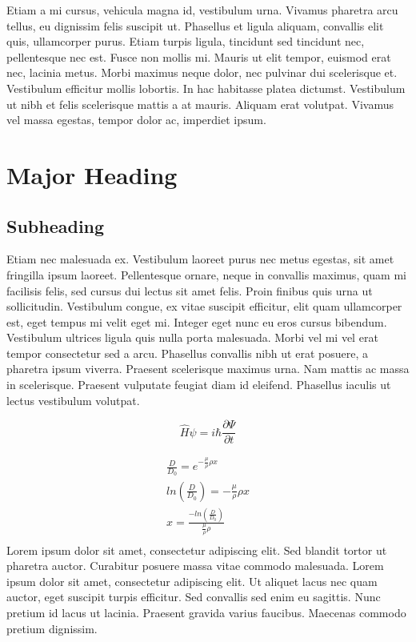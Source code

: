Etiam a mi cursus, vehicula magna id, vestibulum urna. Vivamus pharetra arcu tellus, eu dignissim felis suscipit ut. Phasellus et ligula aliquam, convallis elit quis, ullamcorper purus. Etiam turpis ligula, tincidunt sed tincidunt nec, pellentesque nec est. Fusce non mollis mi. Mauris ut elit tempor, euismod erat nec, lacinia metus. Morbi maximus neque dolor, nec pulvinar dui scelerisque et. Vestibulum efficitur mollis lobortis. In hac habitasse platea dictumst. Vestibulum ut nibh et felis scelerisque mattis a at mauris. Aliquam erat volutpat. Vivamus vel massa egestas, tempor dolor ac, imperdiet ipsum.

\section*{Major Heading}
\subsection*{Subheading}

Etiam nec malesuada ex. Vestibulum laoreet purus nec metus egestas, sit amet fringilla ipsum laoreet. Pellentesque ornare, neque in convallis maximus, quam mi facilisis felis, sed cursus dui lectus sit amet felis. Proin finibus quis urna ut sollicitudin. Vestibulum congue, ex vitae suscipit efficitur, elit quam ullamcorper est, eget tempus mi velit eget mi. Integer eget nunc eu eros cursus bibendum. Vestibulum ultrices ligula quis nulla porta malesuada. Morbi vel mi vel erat tempor consectetur sed a arcu. Phasellus convallis nibh ut erat posuere, a pharetra ipsum viverra. Praesent scelerisque maximus urna. Nam mattis ac massa in scelerisque. Praesent vulputate feugiat diam id eleifend. Phasellus iaculis ut lectus vestibulum volutpat.

\begin{equation} %
     \hat{H} \psi = i \hbar \frac{\partial \Psi}{\partial t}
\end{equation}

\begin{align} %
     \frac{D}{D_0} = e^{-\frac{\mu}{\rho}\rho x} \\
    ln\left(\frac{D}{D_0}\right) = -\frac{\mu}{\rho}\rho x \\
    x = \frac{-ln\left(\frac{D}{D_0}\right)}{\frac{\mu}{\rho}\rho} \\
\end{align}
Lorem ipsum dolor sit amet, consectetur adipiscing elit. Sed blandit tortor ut pharetra auctor. Curabitur posuere massa vitae commodo malesuada. Lorem ipsum dolor sit amet, consectetur adipiscing elit. Ut aliquet lacus nec quam auctor, eget suscipit turpis efficitur. Sed convallis sed enim eu sagittis. Nunc pretium id lacus ut lacinia. Praesent gravida varius faucibus. Maecenas commodo pretium dignissim.

